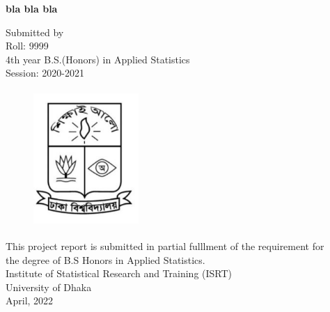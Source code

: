 \documentclass[
  12pt,
  oneside]{report}
\author{}
\date{\vspace{-2.5em}}
\begin{document}
\ifdefined\Shaded\renewenvironment{Shaded}{\begin{tcolorbox}[sharp corners, enhanced, frame hidden, borderline west={3pt}{0pt}{shadecolor}, interior hidden, breakable, boxrule=0pt]}{\end{tcolorbox}}\fi



\begin{center}
\huge{\textbf{bla bla bla}}\\

\vspace*{1.5\baselineskip}

\textbf\Large{{Submitted by}}\\
\vspace{2mm}
\Large{Roll: 9999\\
\vspace{2mm}
4th year B.S.(Honors) in Applied Statistics\\
\vspace{2mm}
Session: 2020-2021}\\

\vspace*{1.5\baselineskip}

\begin{figure}
  \centering
  \includegraphics[width=4cm, height=5.2cm]{../logo/logo.JPG}
\end{figure}


\vspace*{1.5\baselineskip}

\large{This project report is submitted in partial fulllment of the requirement for}\\
\large{the degree of B.S Honors in Applied Statistics.} \\
\vspace*{2\baselineskip}
\Large{Institute of Statistical Research and Training (ISRT) \\
University of Dhaka} \\
\Large{April, 2022}\\

\end{center}
\end{document}

